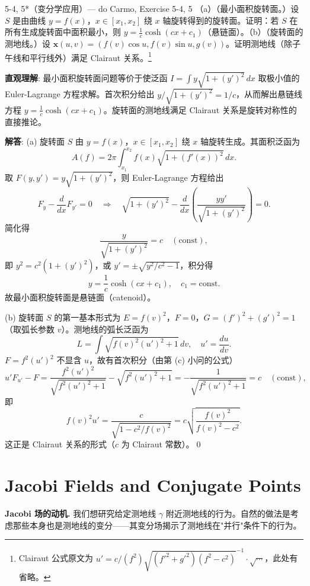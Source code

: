 \begin{exercise}{5-4, 5*（变分学应用）— do Carmo, Exercise 5-4, 5}
（a）（最小面积旋转面。）设 $S$ 是由曲线 $y=f(x)$，$x\in[x_1,x_2]$ 绕 $x$ 轴旋转得到的旋转面。证明：若 $S$ 在所有生成旋转面中面积最小，则 $y = \frac{1}{c}\cosh(cx+c_1)$（悬链面）。（b）（旋转面的测地线。）设 $\mathbf{x}(u,v) = (f(v)\cos u, f(v)\sin u, g(v))$。证明测地线（除子午线和平行线外）满足 Clairaut 关系。\footnote{ Clairaut 公式原文为 $u' = c/(f^2)\sqrt{(f'^2+g'^2)(f^2-c^2)}^{-1}\cdot\sqrt{\cdots}$，此处有省略。}
\end{exercise}
\begin{solution}
\textbf{直观理解}: 最小面积旋转面问题等价于使泛函 $I = \int y\sqrt{1+(y')^2}\,dx$ 取极小值的 Euler-Lagrange 方程求解。首次积分给出 $y/\sqrt{1+(y')^2} = 1/c$，从而解出悬链线方程 $y = \frac{1}{c}\cosh(cx+c_1)$。旋转面的测地线满足 Clairaut 关系是旋转对称性的直接推论。

\textbf{解答}: (a) 旋转面 $S$ 由 $y=f(x)$，$x\in[x_1,x_2]$ 绕 $x$ 轴旋转生成。其面积泛函为
\[
A(f) = 2\pi\int_{x_1}^{x_2} f(x)\sqrt{1+(f'(x))^2}\,dx.
\]
取 $F(y,y') = y\sqrt{1+(y')^2}$，则 Euler-Lagrange 方程给出
\[
F_y - \frac{d}{dx}F_{y'} = 0\quad\Longrightarrow\quad
\sqrt{1+(y')^2} - \frac{d}{dx}\left(\frac{yy'}{\sqrt{1+(y')^2}}\right) = 0.
\]
简化得
\[
\frac{y}{\sqrt{1+(y')^2}} = c\quad(\text{const}),
\]
即 $y^2 = c^2(1+(y')^2)$，或 $y' = \pm\sqrt{y^2/c^2-1}$，积分得
\[
y = \frac{1}{c}\cosh(cx+c_1),\quad c_1=\text{const}.
\]
故最小面积旋转面是悬链面（catenoid）。

(b) 旋转面 $S$ 的第一基本形式为 $E = f(v)^2$，$F=0$，$G = (f')^2+(g')^2 = 1$（取弧长参数 $v$）。测地线的弧长泛函为
\[
L = \int\sqrt{f(v)^2(u')^2 + 1}\,dv,\quad u' = \frac{du}{dv}.
\]
$F = f^2(u')^2$ 不显含 $u$，故有首次积分（由第 (c) 小问的公式）
\[
u'F_{u'} - F = \frac{f^2(u')^2}{\sqrt{f^2(u')^2+1}} - \sqrt{f^2(u')^2+1}
= -\frac{1}{\sqrt{f^2(u')^2+1}} = c\quad(\text{const}),
\]
即
\[
f(v)^2 u' = \frac{c}{\sqrt{1-c^2/f(v)^2}} = c\sqrt{\frac{f(v)^2}{f(v)^2-c^2}}.
\]
这正是 Clairaut 关系的形式（$c$ 为 Clairaut 常数）。\qed
\end{solution}

\section{Jacobi Fields and Conjugate Points}\label{sec:jacobi-conjugate}

\textbf{Jacobi 场的动机.} 我们想研究给定测地线 $\gamma$ 附近测地线的行为。自然的做法是考虑那些本身也是测地线的变分——其变分场揭示了测地线在"并行"条件下的行为。

